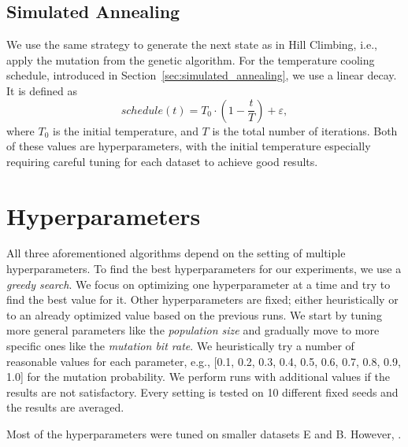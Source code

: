 \subsection*{Simulated Annealing}

We use the same strategy to generate the next state as in Hill Climbing, i.e., apply the mutation from the genetic algorithm. For the temperature cooling schedule, introduced in Section~\ref{sec:simulated_annealing}, we use a linear decay. It is defined as
\begin{equation}
    schedule(t) = T_0 \cdot \left(1 - \frac{t}{T}\right) + \varepsilon,
\end{equation}
where $T_0$ is the initial temperature, and $T$ is the total number of iterations. Both of these values are hyperparameters, with the initial temperature especially requiring careful tuning for each dataset to achieve good results.
\section{Hyperparameters}

All three aforementioned algorithms depend on the setting of multiple hyperparameters. To find the best hyperparameters for our experiments, we use a \textit{greedy search}. We focus on optimizing one hyperparameter at a time and try to find the best value for it. Other hyperparameters are fixed; either heuristically or to an already optimized value based on the previous runs. We start by tuning more general parameters like the \textit{population size} and gradually move to more specific ones like the \textit{mutation bit rate}. We heuristically try a number of reasonable values for each parameter, e.g., [0.1, 0.2, 0.3, 0.4, 0.5, 0.6, 0.7, 0.8, 0.9, 1.0] for the mutation probability. We perform runs with additional values if the results are not satisfactory. Every setting is tested on 10 different fixed seeds and the results are averaged.

Most of the hyperparameters were tuned on smaller datasets E and B. However, .

